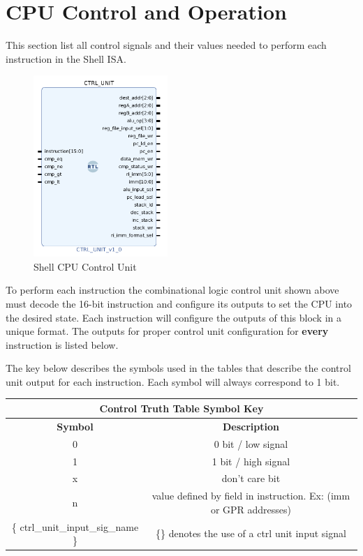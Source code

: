 \documentclass{article}
\begin{document}
\section{CPU Control and Operation}
\label{CPU_CTRL}
\begin{par}
	
	This section list all control signals and their values needed to perform each instruction in the Shell ISA. 

	\begin{figure}[H]
		\centering
		\includegraphics[width=2in]{img/ctrl_unit.png}
		\caption{Shell CPU Control Unit}
	\end{figure}

	To perform each instruction the combinational logic control unit shown above must decode the 16-bit instruction and configure its outputs to set the CPU into the desired state. Each instruction will configure the outputs of this block in a unique format. The outputs for proper control unit configuration for \textbf{every} instruction is listed below.
	
	\hspace{1pt}
	
	The key below describes the symbols used in the tables that describe the control unit output for each instruction. Each symbol will always correspond to 1 bit. 
	
	\begin{center}
		\begin{tabular}{|c|c|}
			\hline 
			\multicolumn{2}{|c|}{\textbf{Control Truth Table Symbol Key}} \\
			\hline 
			\textbf{Symbol} & \textbf{Description} \\ 
			\hline 
			0 & 0 bit / low signal \\ 
			\hline 
			1 & 1 bit / high signal \\ 
			\hline 
			x & don't care bit \\ 
			\hline 
			n & value defined by field in instruction. Ex: (imm or GPR addresses) \\ 
			\hline 
			\{ ctrl\_unit\_input\_sig\_name \} & \{\} denotes the use of a ctrl unit input signal \\ 
			\hline 
		\end{tabular} 
	\end{center}
	

\end{par}
\end{document}
